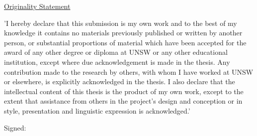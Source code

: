 
\newpage
\thispagestyle{empty}
\null\vfill
\begin{center}
\begin{minipage}{13cm}
\setlength{\parindent}{0cm}
\setlength{\parskip}{2ex}
{\underline{Originality Statement}}
\par
{\rmfamily\normalsize
'I hereby declare that this submission is my own work and to the best of my  
knowledge it contains no materials previously published or written by 
another person, or substantial proportions of material which have been 
accepted for the award of any other degree or diploma at UNSW or any other 
educational institution, except where due acknowledgement is made in the thesis. 
Any contribution made to the research by others, with whom I have 
worked at UNSW or elsewhere, is explicitly acknowledged in the thesis. I 
also declare that the intellectual content of this thesis is the product of my 
own work, except to the extent that assistance from others in the project's 
design and conception or in style, presentation and linguistic expression is 
acknowledged.'
}
\par
\vspace{1.5cm}
{\rmfamily\normalsize \hspace{2cm}Signed:\hrulefill}
\end{minipage}
\end{center}
\vfill\null